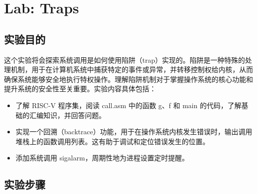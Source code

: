 \section{Lab: Traps}

\subsection{实验目的}
这个实验将会探索系统调用是如何使用陷阱（trap）实现的。陷阱是一种特殊的处理机制，用于在计算机系统中捕获特定的事件或异常，并转移控制权给内核，从而确保系统能够安全地执行特权操作。理解陷阱机制对于掌握操作系统的核心功能和提升系统的安全性至关重要。实验内容具体包括：
\begin{itemize}
    \item 了解 RISC-V 程序集，阅读 call.asm 中的函数 g、f 和 main 的代码，了解基础的汇编知识，并回答问题。
    \item 实现一个回溯（backtrace）功能，用于在操作系统内核发生错误时，输出调用堆栈上的函数调用列表。这有助于调试和定位错误发生的位置。
    \item 添加系统调用 sigalarm，周期性地为进程设置定时提醒。
\end{itemize}

\subsection{实验步骤}
